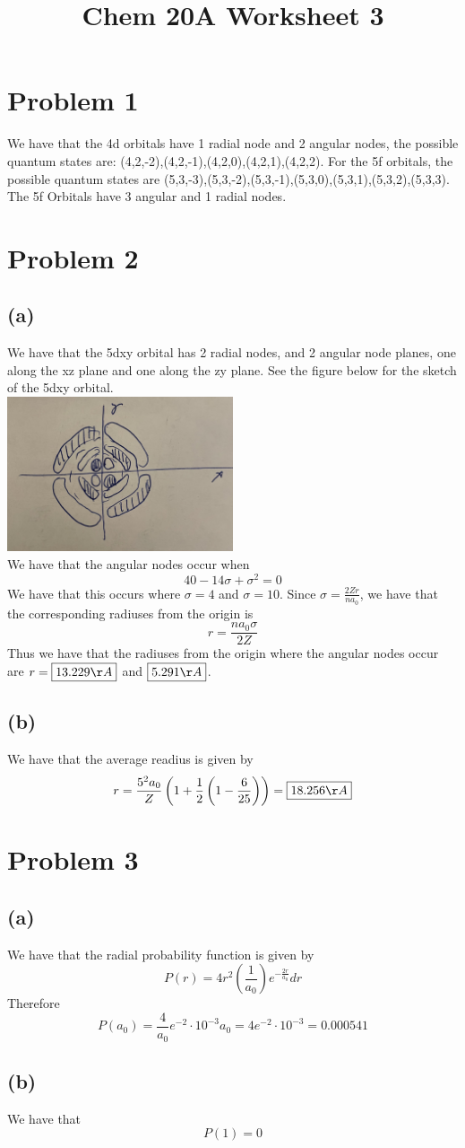 
\title{Chem 20A Worksheet 3}

\maketitle
\section*{Problem 1}
We have that the 4d orbitals have 1 radial node and 2 angular nodes, the possible quantum states are:
(4,2,-2),(4,2,-1),(4,2,0),(4,2,1),(4,2,2). For the 5f orbitals, the possible quantum states are
(5,3,-3),(5,3,-2),(5,3,-1),(5,3,0),(5,3,1),(5,3,2),(5,3,3). The 5f Orbitals have 3 angular and 1 radial 
nodes.
\section*{Problem 2}
\subsection*{(a)}
We have that the 5dxy orbital has 2 radial nodes, and 2 angular node planes, one along the xz 
plane and one along the zy plane. See the figure below for the sketch of the 5dxy orbital.\\
\includegraphics[width=0.5\textwidth]{5dxy.png}
\\
We have that the angular nodes occur when 
$$40-14\sigma+\sigma^2=0$$
We have that this occurs where $\sigma=4$ and $\sigma=10$. Since 
$\sigma=\frac{2Zr}{na_0}$, we have that the corresponding radiuses from the origin is
$$r=\frac{na_0\sigma}{2Z}$$
Thus we have that the radiuses from the origin where the angular nodes occur are
$r=\boxed{13.229\AA}$ and $\boxed{5.291\AA}$.
\subsection*{(b)}
We have that the average readius is given by
$$r=\frac{5^2a_0}{Z}\left(1+\frac{1}{2}\left(1-\frac{6}{25}\right)\right)=\boxed{18.256\AA}$$
\section*{Problem 3}
\subsection*{(a)}
We have that the radial probability function is given by 
$$P(r)=4r^2\left(\frac{1}{a_0}\right)e^{-\frac{2r}{a_0}}dr$$
Therefore 
$$P(a_0)=\frac{4}{a_0}e^{-2}\cdot 10^{-3}a_0=4e^{-2}\cdot 10^{-3}=0.000541$$
\subsection*{(b)}
We have that
$$P(1)=0$$

